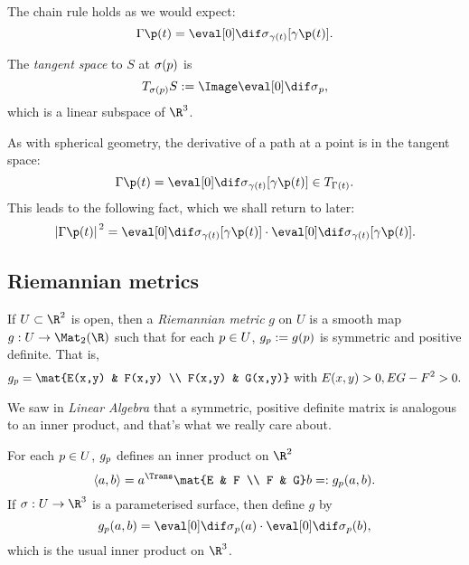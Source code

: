 The chain rule holds as we would expect:
\begin{equation*}
	\Gamma\p(t) = \ddif{\sigma}{\gamma(t)}[\gamma\p(t)].
\end{equation*}

\begin{definition}
	The \emph{tangent space} to $S$ at $\sigma(p)$ is
	\begin{equation*}
		T_{\sigma(\pp)} S := \Image \ddif{\sigma}{\pp},
	\end{equation*}
	which is a linear subspace of $\R^3$.
\end{definition}

As with spherical geometry, the derivative of a path at a point is in the tangent space:
\begin{equation*}
	\Gamma\p(t) = \ddif{\sigma}{\gamma(t)} [\gamma\p(t)] \in T_{\Gamma(t)}.
\end{equation*}
This leads to the following fact, which we shall return to later:
\begin{equation*}
	\left.\vert \Gamma\p(t) \vert\right.^2 = \ddif{\sigma}{\gamma(t)} [\gamma\p(t)] \cdot \ddif{\sigma}{\gamma(t)} [\gamma\p(t)].
\end{equation*}


\subsection{Riemannian metrics} %
\label{sub:riemannian_metrics}

\begin{definition}
	If $U\subset\R^2$ is open, then a \emph{Riemannian metric} $g$ on $U$ is a smooth map $g:U\to\Mat_2(\R)$ such that for each $p\in U$, $g_{p} := g(p)$ is symmetric and positive definite. That is,
	\begin{equation*}
		g_\pp = \mat{E(x,y) & F(x,y) \\ F(x,y) & G(x,y)} \text{ with } E(x,y)>0, EG-F^2>0.
	\end{equation*}
\end{definition}

We saw in \emph{Linear Algebra} that a symmetric, positive definite matrix is analogous to an inner product, and that's what we really care about.

For each $p\in U$, $g_{p}$ defines an inner product on $\R^2$ 
\begin{equation*}
	\left\langle \va,\vb \right\rangle = \va^\Trans \mat{E & F \\ F & G} \vb =: g_\pp(\va,\vb).
\end{equation*}
If $\sigma:U\to\R^3$ is a parameterised surface, then define $g$ by
\begin{equation*}
	g_\pp(\va,\vb) = \ddif{\sigma}{\pp}(\va) \cdot \ddif{\sigma}{\pp}(\vb),
\end{equation*}
which is the usual inner product on $\R^3$.

